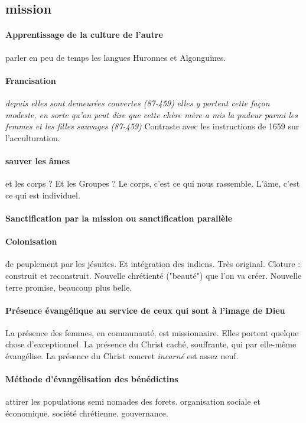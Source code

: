 \subsection{mission}
\paragraph{Apprentissage de la culture de l'autre}
parler en peu de temps les langues Huronnes et Algonguines.

\paragraph{Francisation} \textit{depuis elles sont demeurées couvertes (87-459)}
 \textit{elles y portent cette façon modeste, en sorte qu'on peut dire que cette chère mère a mis la pudeur parmi les femmes et les filles sauvages (87-459)} Contraste avec les instructions de 1659 sur l'acculturation. 

\paragraph{sauver les âmes} et les corps ? Et les Groupes ? Le corps, c'est ce qui nous rassemble. L'âme, c'est ce qui est individuel. 

\paragraph{Sanctification par la mission ou sanctification parallèle}

\paragraph{Colonisation} de peuplement par les jésuites. Et intégration des indiens. Très original. Cloture : construit et reconstruit. Nouvelle chrétienté ("beauté") que l'on va créer.  Nouvelle terre promise, beaucoup plus belle.

\paragraph{Présence évangélique au service de ceux qui sont à l'image de Dieu} La présence des femmes, en communauté, est missionnaire. Elles portent quelque chose d'exceptionnel. La présence du Christ caché, souffrante, qui par elle-même évangélise. La présence du Christ concret \textit{incarné} est assez neuf. 



\paragraph{Méthode d'évangélisation des bénédictins} attirer les populations semi nomades des forets. organisation sociale et économique. société chrétienne.  gouvernance. 

